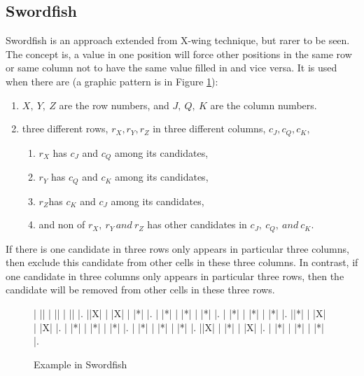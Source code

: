 \documentclass[11pt]{report}
\begin{document}
\subsection{Swordfish}
\label{sec:Swordfish}
Swordfish is an approach extended from X-wing technique, but rarer to be seen. The concept is, a value in one position will force other positions in the same row or same column not to have the same value filled in and vice versa. It is used when there are (a graphic pattern is in Figure \ref{fig:swordfish}):
\begin{enumerate}
\item $X,\ Y,\ Z$ are the row numbers, and $J,\ Q,\ K$ are the column numbers.
\item three different rows, $r_{X}, r_{Y}, r_{Z}$ in three different columns, $c_{J}, c_{Q}, c_{K}$,
\begin{enumerate}
\item $r_{X}$ has $c_{J}$ and $c_{Q}$ among its candidates,
\item $r_{Y}$ has $c_{Q}$ and $c_{K}$ among its candidates,
\item $r_{Z}$has $c_{K}$ and $c_{J}$ among its candidates,
\item and non of $r_{X},\ r_{Y}\, and\ r_{Z}$ has other candidates in $c_{J},\ c_{Q},\ and\ c_{K}.$
\end{enumerate}
\end{enumerate}
If there is one candidate in three rows only appears in particular three columns, then exclude this candidate from other cells in these three columns. In contrast, if one candidate in three columns only appears in particular three rows, then the candidate will be removed from other cells in these three rows.

\begin{figure}[htbp]
\begin{sudoku}
| |{}| | |{}| | |{}| |.
 |{}|X| | |X| | |*| |.
| |*| | |*| | |*| |.
| |*| | |*| | |*| |.
|{}|*| | |X| | |X| |.
| |*| | |*| | |*| |.
| |*| | |*| | |*| |.
|{}|X| | |*| | |X| |.
| |*| | |*| | |*| |.
\end{sudoku}
\caption{Example in Swordfish}
\label{fig:swordfish}
\end{figure}
\end{document}
